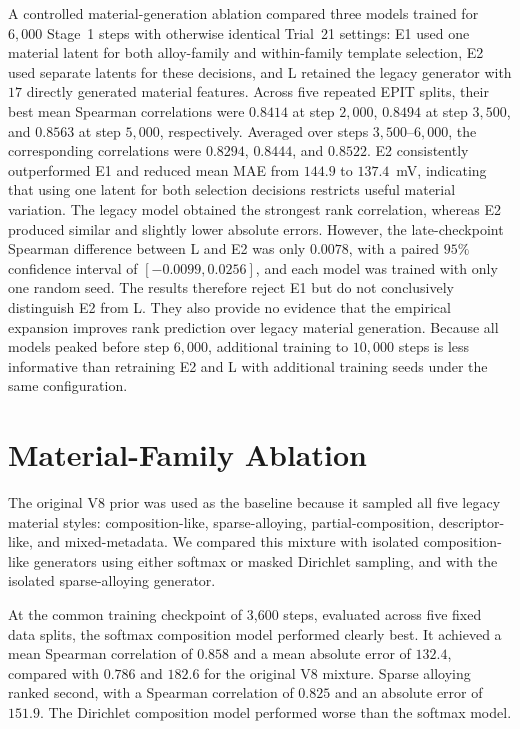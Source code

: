 \documentclass{article}
\begin{document}
A controlled material-generation ablation compared three models trained for \(6{,}000\) Stage~1 steps with otherwise identical Trial~21 settings: E1 used one material latent for both alloy-family and within-family template selection, E2 used separate latents for these decisions, and L retained the legacy generator with \(17\) directly generated material features. Across five repeated EPIT splits, their best mean Spearman correlations were \(0.8414\) at step \(2{,}000\), \(0.8494\) at step \(3{,}500\), and \(0.8563\) at step \(5{,}000\), respectively. Averaged over steps \(3{,}500\)--\(6{,}000\), the corresponding correlations were \(0.8294\), \(0.8444\), and \(0.8522\). E2 consistently outperformed E1 and reduced mean MAE from \(144.9\) to \(137.4\)~mV, indicating that using one latent for both selection decisions restricts useful material variation. The legacy model obtained the strongest rank correlation, whereas E2 produced similar and slightly lower absolute errors. However, the late-checkpoint Spearman difference between L and E2 was only \(0.0078\), with a paired \(95\%\) confidence interval of \([-0.0099,0.0256]\), and each model was trained with only one random seed. The results therefore reject E1 but do not conclusively distinguish E2 from L. They also provide no evidence that the empirical expansion improves rank prediction over legacy material generation. Because all models peaked before step \(6{,}000\), additional training to \(10{,}000\) steps is less informative than retraining E2 and L with additional training seeds under the same configuration.

\section{Material-Family Ablation}

The original V8 prior was used as the baseline because it sampled all five legacy material styles: composition-like, sparse-alloying, partial-composition, descriptor-like, and mixed-metadata. We compared this mixture with isolated composition-like generators using either softmax or masked Dirichlet sampling, and with the isolated sparse-alloying generator.

At the common training checkpoint of 3,600 steps, evaluated across five fixed data splits, the softmax composition model performed clearly best. It achieved a mean Spearman correlation of \(0.858\) and a mean absolute error of \(132.4\), compared with \(0.786\) and \(182.6\) for the original V8 mixture. Sparse alloying ranked second, with a Spearman correlation of \(0.825\) and an absolute error of \(151.9\). The Dirichlet composition model performed worse than the softmax model.
\end{document}
